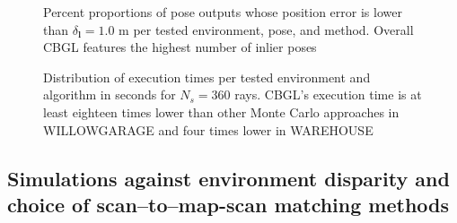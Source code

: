 \begin{figure}
  
  \caption{\small Percent proportions of pose outputs whose position error is
           lower than $\delta_{\bm{l}} = 1.0$ m per tested environment, pose,
           and method. Overall CBGL features the highest number of inlier poses}
  \label{fig:b:inliers_per_pose}
\end{figure}

\begin{figure}
  
  \vspace{0.1cm}
  \caption{\small Distribution of execution times per tested environment and
           algorithm in seconds for $N_s = 360$ rays. CBGL's execution time is
           at least eighteen times lower than other Monte Carlo approaches in
           WILLOWGARAGE and four times lower in WAREHOUSE}
  \label{fig:b:execution_times}
\end{figure}


\subsection{Simulations against environment disparity and choice of scan--to--map-scan matching methods}

\begin{figure}
  
  \vspace{0.6cm}
  \caption{\small}
  \label{fig:}
\end{figure}

